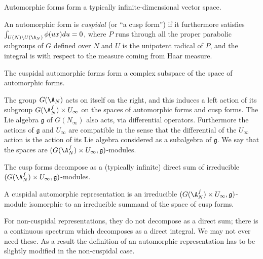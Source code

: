 Automorphic forms form a typically infinite-dimensional vector space.

\begin{definition}\label{cuspidal_automorphic_form}\notready An automorphic form is \emph{cuspidal} (or ``a cusp form'') if it furthermore satisfies $\int_{U(N)\backslash U(\A_N)}\phi(ux)du=0$, where $P$ runs through all the proper parabolic subgroups of $G$ defined over $N$ and $U$ is the unipotent radical of $P$, and the integral is with respect to the measure coming from Haar measure.
\end{definition}

The cuspidal automorphic forms form a complex subspace of the space of automorphic forms.

\begin{definition}\label{automorphic_form_actions}\notready The group $G(\A_N)$ acts on itself on the right, and this induces a left action of its
    subgroup $G(\A_N^f)\times U_\infty$ on the spaces of automorphic forms and cusp forms. The Lie algebra $\mathfrak{g}$ of $G(N_\infty)$ also acts, via differential operators. Furthermore the actions of $\mathfrak{g}$ and $U_\infty$ are compatible in the sense that the differential of the $U_\infty$ action is the action of its Lie algebra considered as a subalgebra of $\mathfrak{g}$. We say that the spaces are $(G(\A_N^f)\times U_\infty,\mathfrak{g})$-modules.
\end{definition}

\begin{theorem}\label{cuspidal_automorphic_form_decomposition} The cusp forms decompose as a (typically infinite) direct sum of irreducible $(G(\A_N^f)\times U_\infty,\mathfrak{g})$-modules.
\end{theorem}
\begin{definition}\label{cuspidal_automorphic_representation}\notready A cuspidal automorphic representation is an irreducible $(G(\A_N^f)\times U_\infty,\mathfrak{g})$-module isomorphic to an irreducible summand of the space of cusp forms.
\end{definition}

For non-cuspidal representations, they do not decompose as a direct sum; there is a continuous spectrum which decomposes as a direct integral. We may not ever need these. As a result the definition of an automorphic representation has to be slightly modified in the non-cuspidal case.


